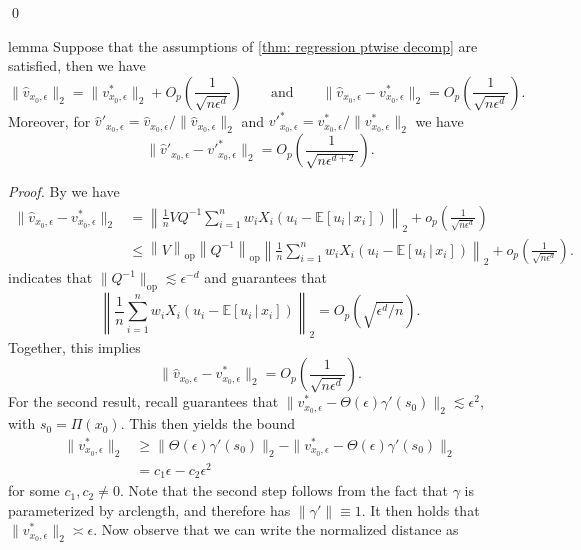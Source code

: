 \documentclass[11pt]{article}
\begin{document}
\qed{}

\begin{restatable}{lemma}{} \label{lemma: scaled high prob bound for velocity}
    Suppose that the assumptions of \cref{thm: regression ptwise decomp} are satisfied, then we have 
    \[\|\hat{v}_{x_0, \epsilon}\|_2  = \|v^*_{x_0, \epsilon}\|_2 + O_p\left(\frac{1}{\sqrt{n\epsilon^d}}\right) \qquad \text{and} \qquad \|\hat{v}_{x_0, \epsilon} - v^*_{x_0, \epsilon}\|_2 = O_p\left(\frac{1}{\sqrt{n\epsilon^d}}\right).\]
    Moreover, for $\hat{v}'_{x_0, \epsilon} = \hat{v}_{x_0, \epsilon}/\|\hat{v}_{x_0, \epsilon}\|_2$ and $v'^*_{x_0, \epsilon} = v^*_{x_0, \epsilon}/\|v^*_{x_0, \epsilon}\|_2$ we have
    \[\|\hat{v}'_{x_0, \epsilon} - v'^*_{x_0, \epsilon}\|_2 = O_p\left(\frac{1}{\sqrt{n\epsilon^{d+2}}}\right).\]
\end{restatable}
\noindent \textit{Proof.} By  we have
\begin{align*}
\|\hat{v}_{x_0, \epsilon} - v^*_{x_0, \epsilon}\|_2 &= \left\|\frac{1}{n}VQ^{-1}\sum_{i = 1}^nw_iX_i(u_i - \mathbb{E}[u_i \,|\, x_i])\right\|_2 +o_p\left(\frac{1}{\sqrt{n\epsilon^{d}}}\right) \\
&\leq \left\|V\right\|_{\text{op}}\left\|Q^{-1}\right\|_{\text{op}}\left\|\frac{1}{n}\sum_{i = 1}^nw_iX_i(u_i - \mathbb{E}[u_i \,|\, x_i])\right\|_2+o_p\left(\frac{1}{\sqrt{n\epsilon^{d}}}\right).
\end{align*}
 indicates that $\|Q^{-1}\|_{\text{op}}\lesssim \epsilon^{-d}$ and  guarantees that \[\left\|\frac{1}{n}\sum_{i = 1}^nw_iX_i(u_i - \mathbb{E}[u_i \,|\, x_i])\right\|_2 = O_p\left(\sqrt{\epsilon^d/n}\right).\] Together, this implies
\[\|\hat{v}_{x_0, \epsilon} - v^*_{x_0, \epsilon}\|_2 = O_p\left(\frac{1}{\sqrt{n\epsilon^d}}\right).\]
For the second result, recall  guarantees that $\|v^*_{x_0, \epsilon} - \Theta(\epsilon)\gamma'(s_0)\|_2 \lesssim \epsilon^2$, with $s_0 = \Pi(x_0)$. This then yields the bound
\begin{align*}
    \|v^*_{x_0, \epsilon}\|_2 &\geq \|\Theta(\epsilon)\gamma'(s_0)\|_2 - \|v^*_{x_0, \epsilon} - \Theta(\epsilon)\gamma'(s_0)\|_2 \\
    &= c_1\epsilon - c_2\epsilon^2
\end{align*}
for some $c_1, c_2 \neq 0$. Note that the second step follows from the fact that $\gamma$ is parameterized by arclength, and therefore has $\|\gamma'\| \equiv 1$. It then holds that $\|v^*_{x_0, \epsilon}\|_2 \asymp \epsilon$. Now observe that we can write the normalized distance as 
\end{document}
